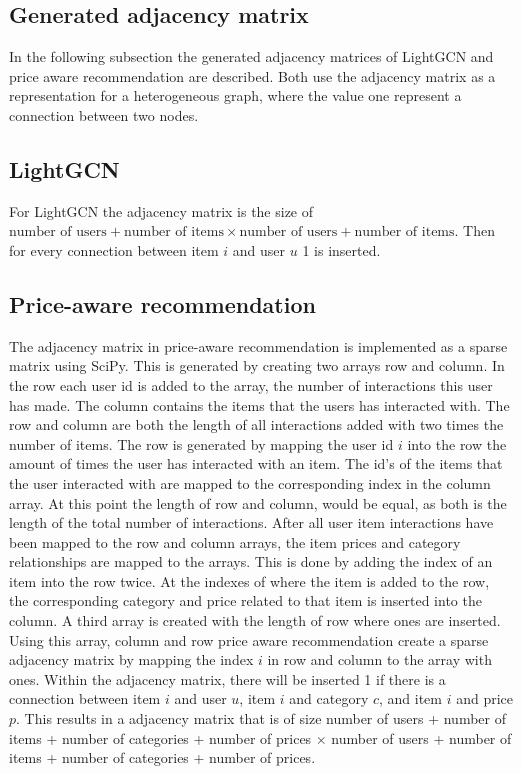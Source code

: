 \subsection{Generated adjacency matrix}
In the following subsection the generated adjacency matrices of LightGCN and price aware recommendation are described.
Both use the adjacency matrix as a representation for a heterogeneous graph, where the value one represent a connection between two nodes.

\subsection{LightGCN}
For LightGCN the adjacency matrix is the size of $\textrm{number of users} + \textrm{number of items} \times \textrm{number of users} + \textrm{number of items}$.
Then for every connection between item $i$ and user $u$ 1 is inserted.

\subsection{Price-aware recommendation}
The adjacency matrix in price-aware recommendation is implemented as a sparse matrix using SciPy.
This is generated by creating two arrays row and column.
In the row each user id is added to the array, the number of interactions this user has made.
The column contains the items that the users has interacted with.
The row and column are both the length of all interactions added with two times the number of items.
The row is generated by mapping the user id $i$ into the row the amount of times the user has interacted with an item.
The id's of the items that the user interacted with are mapped to the corresponding index in the column array.
At this point the length of row and column, would be equal, as both is the length of the total number of interactions.
After all user item interactions have been mapped to the row and column arrays, the item  prices and category relationships are mapped to the arrays.
This is done by adding the index of an item into the row twice.
At the indexes of where the item is added to the row, the corresponding category and price related to that item is inserted into the column.
A third array is created with the length of row where ones are inserted.
Using this array, column and row price aware recommendation create a sparse adjacency matrix by mapping the index $i$ in row and column to the array with ones.
Within the adjacency matrix, there will be inserted 1 if there is a connection between item $i$ and user $u$, item $i$ and category $c$, and item $i$ and price $p$.
This results in a adjacency matrix that is of size number of users + number of items + number of categories + number of prices $\times$ number of users + number of items + number of categories + number of prices.
